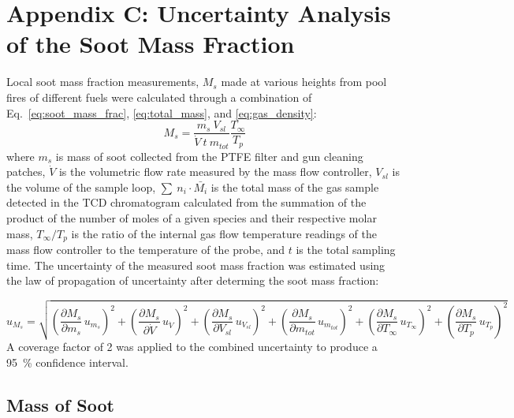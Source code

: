 \documentclass[12pt]{article}
\begin{document}
\pagebreak

\section{Appendix C: Uncertainty Analysis of the Soot Mass Fraction} \label{sec:Uncertainty_Soot_Frac}
Local soot mass fraction measurements, $M_{s}$ made at various heights from pool fires of different fuels were calculated through a combination of Eq.~\ref{eq:soot_mass_frac}, \ref{eq:total_mass}, and \ref{eq:gas_density}:
\begin{equation}\label{eq:overall_soot_mass_frac}
 M_{s}= \frac{m_{s}~V_{sl}}{\dot{V}~t~m_{tot}}\frac{T_{\infty}}{T_{p}}
\end{equation}
where $m_{s}$ is mass of soot collected from the PTFE filter and gun cleaning patches, $\dot{V}$ is the volumetric flow rate measured by the mass flow controller, $V_{sl}$ is the volume of the sample loop, $\sum~n_{i}\cdot\bar{M_{i}}$ is the total mass of the gas sample detected in the TCD chromatogram calculated from the summation of the product of the number of moles of a given species and their respective molar mass, $T_{\infty}/T_{p}$ is the ratio of the internal gas flow temperature readings of the mass flow controller to the temperature of the probe, and $t$ is the total sampling time. The uncertainty of the measured soot mass fraction was estimated using the law of propagation of uncertainty after determing the soot mass fraction:

\begin{equation}
\label{eq:soot_mass_frac_uncertainty}
u_{\scriptscriptstyle M_{s}} = \sqrt{{\left(\frac{\partial M_{s}}{\partial m_{s}}\,u_{\scriptscriptstyle m_{s}} \right)}^2+{\left(\frac{\partial M_{s}}{\partial \dot{V} }\,u_{\scriptscriptstyle \dot{V}} \right)}^2+{\left(\frac{\partial M_{s}}{\partial V_{sl}}\,u_{\scriptscriptstyle V_{sl}} \right)}^2+{\left(\frac{\partial M_{s}}{\partial m_{tot}}\,u_{\scriptscriptstyle m_{tot}} \right)}^2+{\left(\frac{\partial M_{s}}{\partial T_{\infty}}\,u_{\scriptscriptstyle T_{\infty}} \right)}^2+{\left(\frac{\partial M_{s}}{\partial T_{p}}\,u_{\scriptscriptstyle T_{p}} \right)}^2}
\end{equation}
A coverage factor of 2 was applied to the combined uncertainty to produce a 95~\% confidence interval.
\subsection{Mass of Soot}
\label{ssec:Mass_of_Soot}
\end{document}
